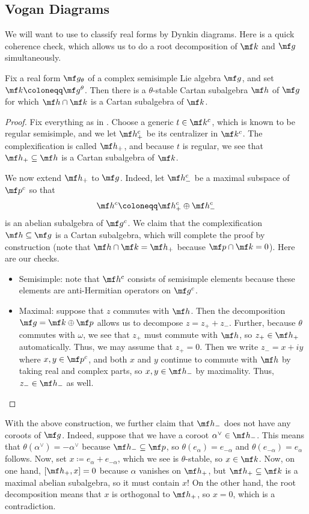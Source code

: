 \documentclass[../notes.tex]{subfiles}
\begin{document}
\subsection{Vogan Diagrams}
We will want to use  to classify real forms by Dynkin diagrams. Here is a quick coherence check, which allows us to do a root decomposition of $\mf k$ and $\mf g$ simultaneously.
\begin{proposition} \label{prop:get-cartan-g-theta}
	Fix a real form $\mf g_\theta$ of a complex semisimple Lie algebra $\mf g$, and set $\mf k\coloneqq\mf g^\theta$. Then there is a $\theta$-stable Cartan subalgebra $\mf h$ of $\mf g$ for which $\mf h\cap\mf k$ is a Cartan subalgebra of $\mf k$.
\end{proposition}
\begin{proof}
	Fix everything as in . Choose a generic $t\in\mf k^c$, which is known to be regular semisimple, and we let $\mf h_+^c$ be its centralizer in $\mf k^c$. The complexification is called $\mf h_+$, and because $t$ is regular, we see that $\mf h_+\subseteq\mf h$ is a Cartan subalgebra of $\mf k$.

	We now extend $\mf h_+$ to $\mf g$. Indeed, let $\mf h_-^c$ be a maximal subspace of $\mf p^c$ so that
	\[\mf h^c\coloneqq\mf h_+^c\oplus\mf h_-^c\]
	is an abelian subalgebra of $\mf g^c$. We claim that the complexification $\mf h\subseteq\mf g$ is a Cartan subalgebra, which will complete the proof by construction (note that $\mf h\cap\mf k=\mf h_+$ because $\mf p\cap\mf k=0$). Here are our checks.
	\begin{itemize}
		\item Semisimple: note that $\mf h^c$ consists of semisimple elements because these elements are anti-Hermitian operators on $\mf g^c$.
		\item Maximal: suppose that $z$ commutes with $\mf h$. Then the decomposition $\mf g=\mf k\oplus\mf p$ allows us to decompose $z=z_++z_-$. Further, because $\theta$ commutes with $\omega$, we see that $z_+$ must commute with $\mf h$, so $z_+\in\mf h_+$ automatically. Thus, we may assume that $z_+=0$. Then we write $z_-=x+iy$ where $x,y\in\mf p^c$, and both $x$ and $y$ continue to commute with $\mf h$ by taking real and complex parts, so $x,y\in\mf h_-$ by maximality. Thus, $z_-\in\mf h_-$ as well.
		\qedhere
	\end{itemize}
\end{proof}
\begin{remark}
	With the above construction, we further claim that $\mf h_-$ does not have any coroots of $\mf g$. Indeed, suppose that we have a coroot $\alpha^\lor\in\mf h_-$. This means that $\theta(\alpha^\lor)=-\alpha^\lor$ because $\mf h_-\subseteq\mf p$, so $\theta(e_\alpha)=e_{-\alpha}$ and $\theta(e_{-\alpha})=e_\alpha$ follows. Now, set $x\coloneqq e_\alpha+e_{-\alpha}$, which we see is $\theta$-stable, so $x\in\mf k$. Now, on one hand, $[\mf h_+,x]=0$ because $\alpha$ vanishes on $\mf h_+$, but $\mf h_+\subseteq\mf k$ is a maximal abelian subalgebra, so it must contain $x$! On the other hand, the root decomposition means that $x$ is orthogonal to $\mf h_+$, so $x=0$, which is a contradiction.
\end{remark}
\end{document}
